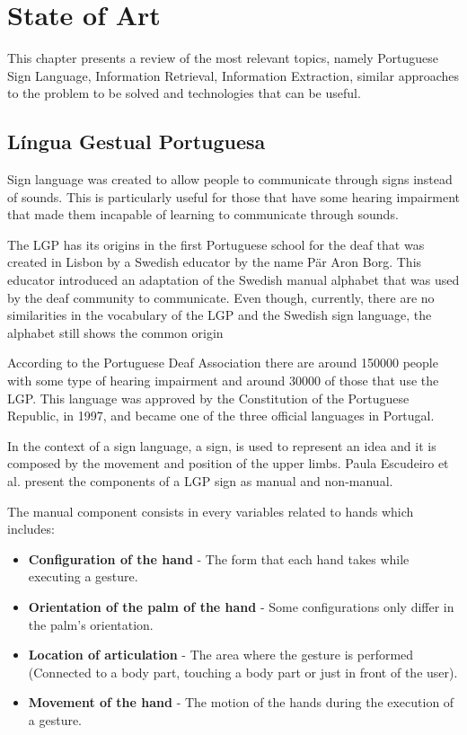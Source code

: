 
\chapter{State of Art}
\label{chap:Chapter2}

This chapter presents a review of the most relevant topics, namely Portuguese Sign Language, Information Retrieval, Information Extraction, similar approaches to the problem to be solved and technologies that can be useful.

\section{Língua Gestual Portuguesa}

Sign language was created to allow people to communicate through signs instead of sounds.
This is particularly useful for those that have some hearing impairment that made them incapable of learning to communicate through sounds.

The \gls{LGP} has its origins in the first Portuguese school for the deaf that was created in Lisbon by a Swedish educator by the name Pär Aron Borg.
This educator introduced an adaptation of the Swedish manual alphabet that was used by the deaf community to communicate.
Even though, currently, there are no similarities in the vocabulary of the \gls{LGP} and the Swedish sign language, the alphabet still shows the common origin\cite{oliveira2013tradutor}\cite{escudeiro2015virtual}

According to the Portuguese Deaf Association there are around 150000 people with some type of hearing impairment and around 30000 of those that use the \gls{LGP}\cite{gaspar2015if2lgp}.
This language was approved by the Constitution of the Portuguese Republic, in 1997, and became one of the three official languages in Portugal.

In the context of a sign language, a sign, is used to represent an idea and it is composed by the movement and position of the upper limbs.
Paula Escudeiro et al.\cite{escudeiro2015virtual} present the components of a \gls{LGP} sign as manual and non-manual.

The manual component consists in every variables related to hands which includes:
\begin{itemize}
    \item \textbf{Configuration of the hand} - The form that each hand takes while executing a gesture.
    \item \textbf{Orientation of the palm of the hand} - Some configurations only differ in the palm's orientation.
    \item \textbf{Location of articulation} - The area where the gesture is performed (Connected to a body part, touching a body part or just in front of the user).
    \item \textbf{Movement of the hand} - The motion of the hands during the execution of a gesture.
\end{itemize}

